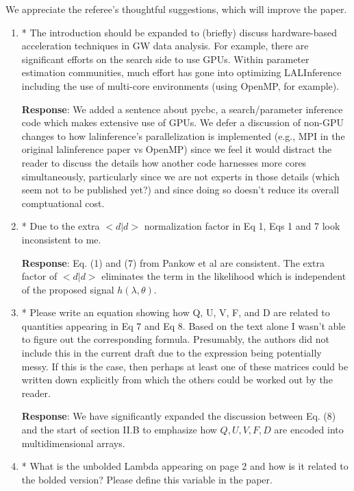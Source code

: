 \documentclass[onecolumn]{revtex4}
\begin{document}
We appreciate the referee's thoughtful suggestions, which will improve the paper.


\begin{enumerate}
\item * The introduction should be expanded to (briefly) discuss
hardware-based acceleration techniques in GW data analysis. For
example, there are significant efforts on the search side to use GPUs.
Within parameter estimation communities, much effort has gone into
optimizing LALInference including the use of multi-core environments
(using OpenMP, for example).

\noindent \textbf{Response}:  We added a sentence about pycbc, a search/parameter inference code which makes extensive
use of GPUs.    We defer a discussion of non-GPU changes to how lalinference's parallelization is implemented (e.g., MPI in the original
lalinference paper vs OpenMP) since we feel it would distract the reader to discuss the details how another code harnesses more cores
simultaneously, particularly since we are not experts in those details (which seem not to be published yet?) and since doing so doesn't reduce its overall comptuational cost.

\item * Due to the extra $<d | d >$ normalization factor in Eq 1, Eqs 1 and 7
look inconsistent to me.

\noindent \textbf{Response}:  Eq. (1) and (7) from Pankow et al are consistent.  The extra factor of $<d|d>$ eliminates the term in the likelihood which is independent of
the proposed signal $h(\lambda,\theta)$.

\item * Please write an equation showing how Q, U, V, F, and D are related
to quantities appearing in Eq 7 and Eq 8. Based on the text alone I
wasn't able to figure out the corresponding formula. Presumably, the
authors did not include this in the current draft due to the
expression being potentially messy. If this is the case, then perhaps
at least one of these matrices could be written down explicitly from
which the others could be worked out by the reader.

\noindent \textbf{Response}: We have significantly expanded the discussion between Eq. (8) and the start of section II.B
to emphasize how $Q,U,V,F,D$ are encoded into multidimensional arrays.



\item * What is the unbolded Lambda appearing on page 2 and how is it
related to the bolded version? Please define this variable in the
paper.


\end{enumerate}
\end{document}
